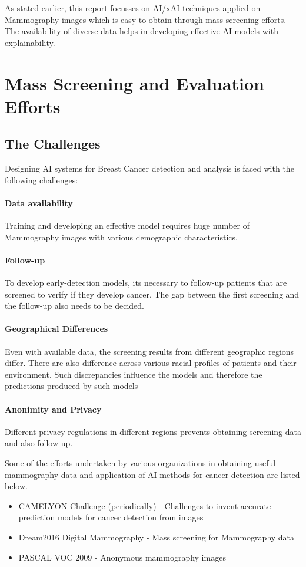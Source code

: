 \documentclass[sigconf, language=english]{acmart}
\begin{document}
As stated earlier, this report focusses on AI/xAI techniques applied on Mammography images which is easy to obtain through mass-screening efforts. The availability of diverse data helps in developing effective AI models with explainability.

\section{Mass Screening and Evaluation Efforts}

\subsection{The Challenges}

Designing AI systems for Breast Cancer detection and analysis is faced with the following challenges:

\paragraph{Data availability} Training and developing an effective model requires huge number of Mammography images with various demographic characteristics.

\paragraph{Follow-up} To develop early-detection models, its necessary to follow-up patients that are screened to verify if they develop cancer. The gap between the first screening and the follow-up also needs to be decided. 

\paragraph{Geographical Differences} Even with available data, the screening results from different geographic regions differ. There are also difference across various racial profiles of patients and their environment. Such discrepancies influence the models and therefore the predictions produced by such models

\paragraph{Anonimity and Privacy} Different privacy regulations in different regions prevents obtaining screening data and also follow-up.

Some of the efforts undertaken by various organizations in obtaining useful mammography data and application of AI methods for cancer detection are listed below.
\begin{itemize}
\item CAMELYON Challenge (periodically) - Challenges to invent accurate prediction models for cancer detection from images
\item Dream2016 Digital Mammography - Mass screening for Mammography data
\item PASCAL VOC 2009 - Anonymous mammography images
\end{itemize}
\end{document}
